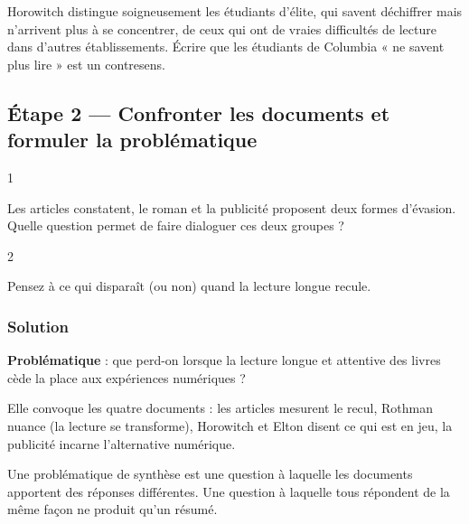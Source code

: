 \documentclass[11pt,a4paper]{article}
\begin{document}
\begin{piege}

Horowitch distingue soigneusement les étudiants d'élite, qui savent déchiffrer mais n'arrivent plus à se concentrer, de ceux qui ont de vraies difficultés de lecture dans d'autres établissements. Écrire que les étudiants de Columbia « ne savent plus lire » est un contresens.

\end{piege}

\hypertarget{uxe9tape-2-confronter-les-documents-et-formuler-la-probluxe9matique}{%
\subsection{Étape 2 --- Confronter les documents et formuler la problématique}\label{uxe9tape-2-confronter-les-documents-et-formuler-la-probluxe9matique}}

\begin{indication}{1}

Les articles constatent, le roman et la publicité proposent deux formes d'évasion. Quelle question permet de faire dialoguer ces deux groupes ?

\end{indication}

\begin{indication}{2}

Pensez à ce qui disparaît (ou non) quand la lecture longue recule.

\end{indication}

\hypertarget{solution-1}{%
\subsubsection{Solution}\label{solution-1}}

\textbf{Problématique} : que perd-on lorsque la lecture longue et attentive des livres cède la place aux expériences numériques ?

Elle convoque les quatre documents : les articles mesurent le recul, Rothman nuance (la lecture se transforme), Horowitch et Elton disent ce qui est en jeu, la publicité incarne l'alternative numérique.

\begin{methode}

Une problématique de synthèse est une question à laquelle les documents apportent des réponses différentes. Une question à laquelle tous répondent de la même façon ne produit qu'un résumé.

\end{methode}
\end{document}
